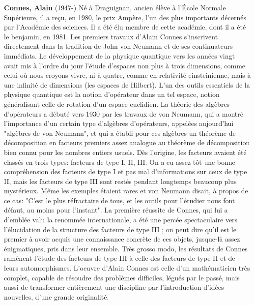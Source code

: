 \textbf{Connes, Alain} (1947-) Né à Draguignan, ancien élève à l'École Normale Supérieure, il a reçu, en 1980, le prix Ampère, l'un des plus importants décernés par l'Académie des sciences. Il a été élu membre de cette académie, dont il a été le benjamin, en 1981. Les premiers travaux d'Alain Connes s'inscrivent directement dans la tradition de John von Neumann et de ses continuateurs immédiats. Le développement de la physique quantique vers les années vingt avait mis à l'ordre du jour l'étude d'espaces non plus à trois dimensions, comme celui où nous croyons vivre, ni à quatre, comme en relativité einsteinienne, mais à une infinité de dimensions (les espaces de Hilbert). L'un des outils essentiels de la physique quantique est la notion d'opérateur dans un tel espace, notion généralisant celle de rotation d'un espace euclidien. La théorie des algèbres d'opérateurs a débuté vers 1930 par les travaux de von Neumann, qui a montré l'importance d'un certain type d'algèbres d'opérateurs, appelées aujourd'hui "algèbres de von Neumann", et qui a établi pour ces algèbres un théorème de décomposition en facteurs premiers assez analogue au théorème de décomposition bien connu pour les nombres entiers usuels. Dès l'origine, les facteurs avaient été classés en trois types: facteurs de type I, II, III. On a eu assez tôt une bonne compréhension des facteurs de type I et pas mal d'informations sur  ceux de type II, mais les facteurs de type III sont restés pendant longtemps beaucoup plus mystérieux. Même les exemples étaient rares et von Neumann disait, à propos de ce cas: "C'est le plus réfractaire de tous, et les outils pour l'étudier nous font défaut, au moins pour l'instant". La première réussite de Connes, qui lui a d'emblée valu la renommée internationale, a été une percée spectaculaire vers l'élucidation de la structure des facteurs de type III ; on peut dire qu'il est le premier à avoir acquis une connaissance concrète de ces objets, jusque-là assez énigmatiques, pris dans leur ensemble. Très grosso modo, les résultats de Connes ramènent l'étude des facteurs de type III à celle des facteurs de type II et de leurs automorphismes. L'oeuvre d'Alain Connes est celle d'un mathématicien très complet, capable de résoudre des problèmes difficiles, légués par le passé, mais aussi de transformer entièrement une discipline par l'introduction d'idées nouvelles, d'une grande originalité.

